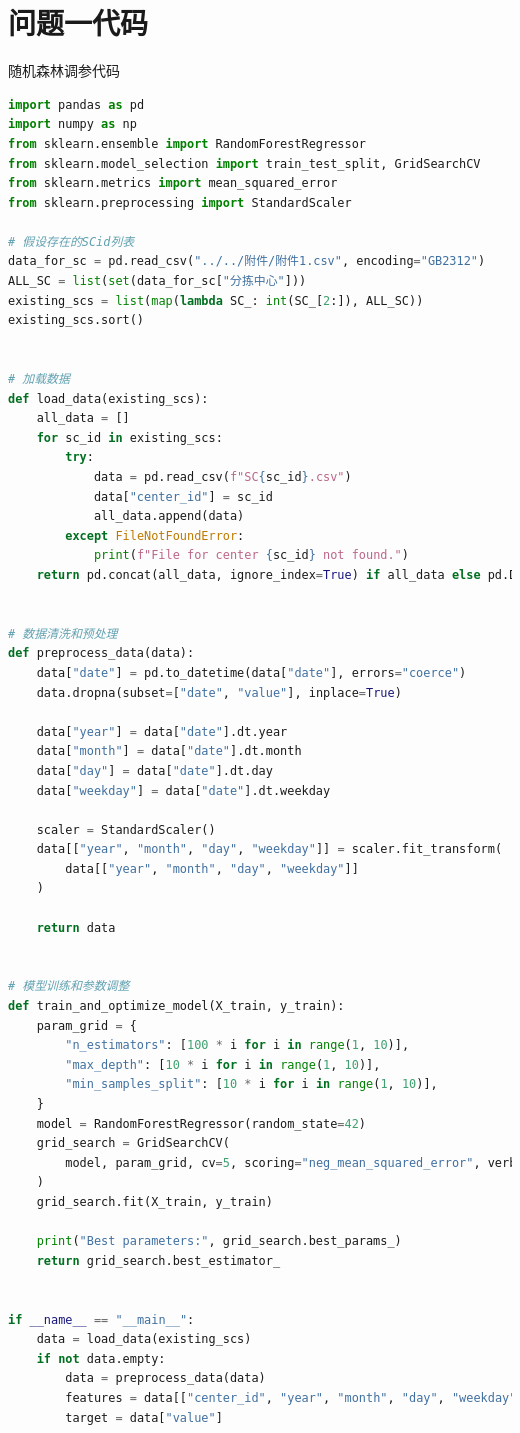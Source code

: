 \documentclass[UTF8]{article}%
\begin{document}
\section{问题一代码}
\noindent 随机森林调参代码
\begin{lstlisting}[language=python]
import pandas as pd
import numpy as np
from sklearn.ensemble import RandomForestRegressor
from sklearn.model_selection import train_test_split, GridSearchCV
from sklearn.metrics import mean_squared_error
from sklearn.preprocessing import StandardScaler

# 假设存在的SCid列表
data_for_sc = pd.read_csv("../../附件/附件1.csv", encoding="GB2312")
ALL_SC = list(set(data_for_sc["分拣中心"]))
existing_scs = list(map(lambda SC_: int(SC_[2:]), ALL_SC))
existing_scs.sort()


# 加载数据
def load_data(existing_scs):
    all_data = []
    for sc_id in existing_scs:
        try:
            data = pd.read_csv(f"SC{sc_id}.csv")
            data["center_id"] = sc_id
            all_data.append(data)
        except FileNotFoundError:
            print(f"File for center {sc_id} not found.")
    return pd.concat(all_data, ignore_index=True) if all_data else pd.DataFrame()


# 数据清洗和预处理
def preprocess_data(data):
    data["date"] = pd.to_datetime(data["date"], errors="coerce")
    data.dropna(subset=["date", "value"], inplace=True)

    data["year"] = data["date"].dt.year
    data["month"] = data["date"].dt.month
    data["day"] = data["date"].dt.day
    data["weekday"] = data["date"].dt.weekday

    scaler = StandardScaler()
    data[["year", "month", "day", "weekday"]] = scaler.fit_transform(
        data[["year", "month", "day", "weekday"]]
    )

    return data


# 模型训练和参数调整
def train_and_optimize_model(X_train, y_train):
    param_grid = {
        "n_estimators": [100 * i for i in range(1, 10)],
        "max_depth": [10 * i for i in range(1, 10)],
        "min_samples_split": [10 * i for i in range(1, 10)],
    }
    model = RandomForestRegressor(random_state=42)
    grid_search = GridSearchCV(
        model, param_grid, cv=5, scoring="neg_mean_squared_error", verbose=2
    )
    grid_search.fit(X_train, y_train)

    print("Best parameters:", grid_search.best_params_)
    return grid_search.best_estimator_


if __name__ == "__main__":
    data = load_data(existing_scs)
    if not data.empty:
        data = preprocess_data(data)
        features = data[["center_id", "year", "month", "day", "weekday"]]
        target = data["value"]


\end{lstlisting}
\end{document}
